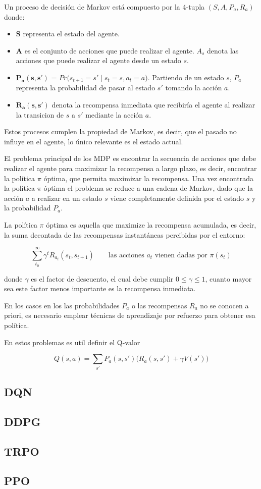 Un proceso de decisión de Markov está compuesto por la 4-tupla $(S,A,P_a,R_a)$ donde:

\begin{itemize}
	\item \textbf{S} representa el estado del agente.
	\item \textbf{A} es el conjunto de acciones que puede realizar el agente. $A_s$ denota las acciones que puede realizar el agente desde un estado $s$.
	\item \textbf{$\boldsymbol{P_a(s,s')}$} = $Pr\big(s_{t+1} = s' \;|\; s_t = s , a_t = a  \big)$. Partiendo de un estado $s$, $P_a$ representa la probabilidad de pasar al estado $s'$ tomando la acción $a$.
	\item \textbf{$\boldsymbol{R_a(s,s')}$} denota la recompensa inmediata que recibiría el agente al realizar la transicion de $s$ a $s'$ mediante la acción $a$.
\end{itemize}

Estos procesos cumplen la propiedad de Markov, es decir, que el pasado no influye en el agente, lo único relevante es el estado actual.

El problema principal de los MDP es encontrar la secuencia de acciones que debe realizar el agente para maximizar la recompensa a largo plazo, es decir, encontrar la política $\pi$ 
óptima, que permita maximizar la recompensa. Una vez encontrada la política $\pi$ óptima el problema se reduce a una cadena de Markov, dado que la acción $a$ a realizar en un estado $s$ viene completamente definida por el estado $s$ y la probabilidad $P_a$. 

La política $\pi$ óptima es aquella que maximize la recompensa acumulada, es decir, la suma decontada de las recompensas instantáneas percibidas por el entorno:

\begin{equation}
	\sum_{t_0}^{\infty}\gamma^t R_{a_t}(s_t,s_{t+1}) \qquad \text{las acciones $a_t$ vienen dadas por $\pi(s_t)$}
\end{equation}

donde $\gamma$ es el factor de descuento, el cual debe cumplir $0 \le \gamma \le 1$, cuanto mayor sea este factor menos importante es la recompensa inmediata. 

En los casos en los las probabilidades $P_a$ o las recompensas $R_a$ no se conocen a priori, es necesario emplear técnicas de aprendizaje por refuerzo para obtener esa política.

En estos problemas es util definir el Q-valor

\begin{equation}
Q(s,a) = \sum_{s'}P_a(s,s')\big(R_a(s,s')+\gamma V(s') \big)
\end{equation}

\subsection{DQN}
\subsection{DDPG}
\subsection{TRPO}
\subsection{PPO}